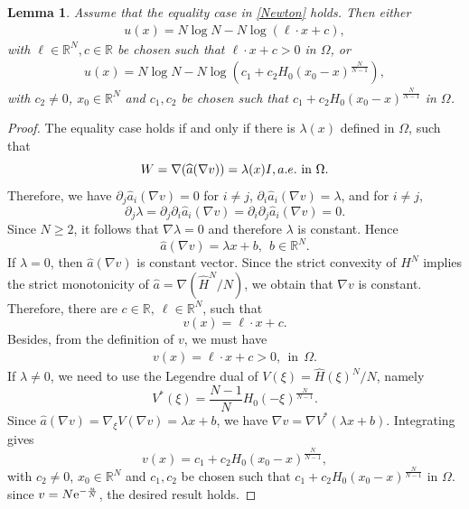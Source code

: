 \documentclass[reqno, 11pt]{amsart} %
\numberwithin{equation}{section}
\newtheorem{lemma}[thm]{Lemma}
\theoremstyle{definition}
\newcommand{\R}{\mathbb{R}}
\newcommand{\e}{\textup{e}}
\begin{document}
\begin{lemma}\label{lem:equality-profile}
Assume that the equality case in \eqref{Newton} holds.  Then either
\begin{align*}
    u(x) = N \log N - N \log (\ell \cdot x + c),
\end{align*}
with $\ell \in \R^N, c \in \R$ be chosen such that $\ell \cdot x + c > 0 $ in $\Omega$, or
\begin{align*}
    u(x) = N \log N - N \log (c_1 + c_2 H_0(x_0-x)^{\frac{N}{N-1}}),
\end{align*}
with $c_2 \neq 0$, $x_0 \in \R^N$ and $c_1, c_2$ be chosen such that $c_1 + c_2 H_0(x_0-x)^{\frac{N}{N-1}} $ in $\Omega$.
\end{lemma}

\begin{proof}
The equality case holds if and only if there is $\lambda(x)$ defined in $\Omega$, such that
\[
       W=\nabla(\widehat a(\nabla v))=\lambda(x)I, a.e. \hbox{ in }\Omega.
\]
Therefore, we have $\partial_j \widehat{a}_i(\nabla v)=0$ for $i\ne j$, $\partial_i \widehat{a}_i(\nabla v)=\lambda$, and for $i\ne j$,
\[
    \partial_j\lambda =\partial_j \partial_i \widehat{a}_i(\nabla v)=\partial_i\partial_j \widehat{a}_i(\nabla v)=0.
\]
Since $N\ge2$, it follows that $\nabla\lambda=0$ and therefore $\lambda$ is constant. Hence
\[
       \widehat{a}(\nabla v)=\lambda x+b, \ \ b \in \R^N.
\]
If $\lambda=0$, then $\widehat{a}(\nabla v)$ is constant vector. Since the strict convexity of $H^N$ implies the strict monotonicity of $\widehat a=\nabla(\widehat H^N/N)$, we obtain that $\nabla v$ is constant. Therefore, there are $c \in \R, \  \ell \in \R^N$, such that
\[
    v(x) = \ell \cdot x + c.
\]
Besides, from the definition of $v$, we must have
\begin{align*}
    v(x) = \ell \cdot x + c > 0, \ \ \text{in} \ \ \Omega.
\end{align*}
If $\lambda \ne 0$, we need to use the Legendre dual of $V(\xi) = \widehat H(\xi)^N / N$, namely
\[
       V^*(\xi)=\frac{N-1}{N} H_0(-\xi)^{\frac{N}{N-1}}.
\]
Since $\widehat{a}(\nabla v)=\nabla_{\xi} V(\nabla v) = \lambda x + b$, we have $\nabla v=\nabla V^*(\lambda x+b)$.  Integrating gives
\[
       v(x) = c_1 + c_2 H_0(x_0-x)^{\frac{N}{N-1}},
\]
with $c_2 \neq 0$, $x_0 \in \R^N$ and $c_1, c_2$ be chosen such that $c_1 + c_2 H_0(x_0-x)^{\frac{N}{N-1}} $ in $\Omega$.  since $v = N \e^{-\frac{u}{N}}$, the desired result holds.
\end{proof}
\end{document}
